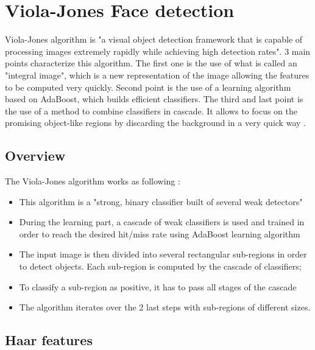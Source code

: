 \chapter{Viola-Jones Face detection}
\label{chap:vj}

\noindent Viola-Jones algorithm is "a visual object detection framework that is capable of processing images extremely rapidly while achieving high detection rates". 3 main points characterize this algorithm. The first one is the use of what is called an "integral image", which is a new representation of the image allowing the features to be computed very quickly. Second point is the use of a learning algorithm based on AdaBoost, which builds efficient classifiers. The third and last point is the use of a method to combine classifiers in cascade. It allows to focus on the promising object-like regions by discarding the background in a very quick way \cite{VIO01}.
\newline

\section{Overview}

\vspace{\baselineskip}
\noindent The Viola-Jones algorithm works as following \cite{DIN08}:

\begin{itemize}
  \item This algorithm is a "strong, binary classifier built of several weak detectors"
  \item During the learning part, a cascade of weak classifiers is used and trained in order to reach the desired hit/miss rate using AdaBoost learning algorithm
  \item The input image is then divided into several rectangular sub-regions in order to detect objects. Each sub-region is computed by the cascade of classifiers;
  \item To classify a sub-region as positive, it has to pass all stages of the cascade
  \item The algorithm iterates over the 2 last steps with sub-regions of different sizes.
\end{itemize}

\section{Haar features}

